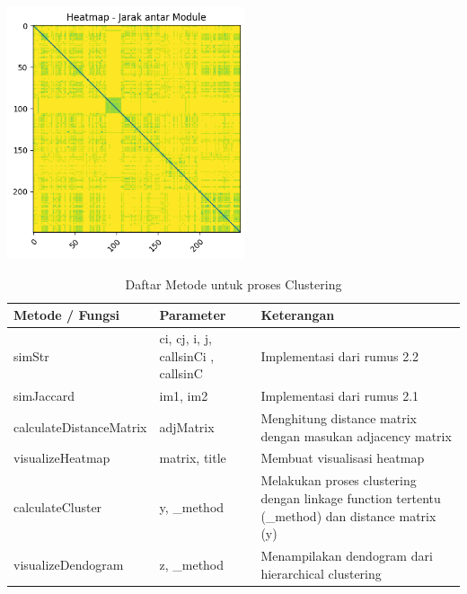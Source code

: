 \begin{center}
	\includegraphics[width=7cm]{img/bab_4/HeatmapModule.png}
	\label{fig:heatmap_gambar}
\end{center}


\begingroup
\setlength{\LTleft}{-20cm plus -1fill}
\setlength{\LTright}{\LTleft}
\begin{small}
	\begin{longtable}{|p{4cm}|p{3cm}|p{6cm}|}
		\caption{Daftar Metode untuk proses Clustering}\\
		\hline
		\textbf{Metode / Fungsi} & \textbf{Parameter} & \textbf{Keterangan}\\
		\endfirsthead
		
		\hline  

		simStr
		& ci, cj, i, j, callsinCi , callsinC
		 & Implementasi dari rumus 2.2  \\

		 \hline  

		 simJaccard
		& im1, im2
		 & Implementasi dari rumus 2.1   \\

		 \hline  

		 calculateDistanceMatrix
		& adjMatrix
		 & Menghitung distance matrix dengan masukan adjacency matrix  \\

		 \hline  

		 visualizeHeatmap
		& matrix, title
		 & Membuat visualisasi heatmap  \\

		 \hline  

		 calculateCluster
		& y, {\_}method
		 & Melakukan proses clustering dengan linkage function tertentu ({\_}method) dan distance matrix (y) \\

		 \hline
		
		 visualizeDendogram
		& z, {\_}method
		 & Menampilakan dendogram dari hierarchical clustering  \\

		 \hline
	\end{longtable}
\end{small}
\endgroup

